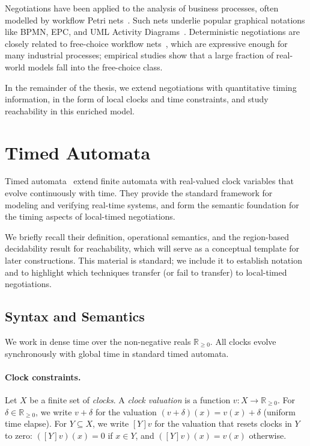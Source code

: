 Negotiations have been applied to the analysis of business processes, often modelled by workflow Petri nets~\cite{EsparzaWorkflow}. Such nets underlie popular graphical notations like BPMN, EPC, and UML Activity Diagrams~\cite{DijkmanBPMN}. Deterministic negotiations are closely related to free-choice workflow nets~\cite{EsparzaFreeChoice}, which are expressive enough for many industrial processes; empirical studies show that a large fraction of real-world models fall into the free-choice class.

In the remainder of the thesis, we extend negotiations with quantitative timing information, in the form of local clocks and time constraints, and study reachability in this enriched model.

\section{Timed Automata}
\label{sec:prelim-ta}

Timed automata~\cite{AlurDillTA} extend finite automata with real-valued clock variables that evolve continuously with time. They provide the standard framework for modeling and verifying real-time systems, and form the semantic foundation for the timing aspects of local-timed negotiations.

We briefly recall their definition, operational semantics, and the region-based decidability result for reachability, which will serve as a conceptual template for later constructions. This material is standard; we include it to establish notation and to highlight which techniques transfer (or fail to transfer) to local-timed negotiations.

\subsection{Syntax and Semantics}

We work in dense time over the non-negative reals $\mathbb{R}_{\geq 0}$. All clocks evolve synchronously with global time in standard timed automata.

\paragraph{Clock constraints.} Let $X$ be a finite set of \emph{clocks}. A \emph{clock valuation} is a function $v : X \to \mathbb{R}_{\geq 0}$. For $\delta \in \mathbb{R}_{\geq 0}$, we write $v + \delta$ for the valuation $(v + \delta)(x) = v(x) + \delta$ (uniform time elapse). For $Y \subseteq X$, we write $[Y]v$ for the valuation that resets clocks in $Y$ to zero: $([Y]v)(x) = 0$ if $x \in Y$, and $([Y]v)(x) = v(x)$ otherwise.

